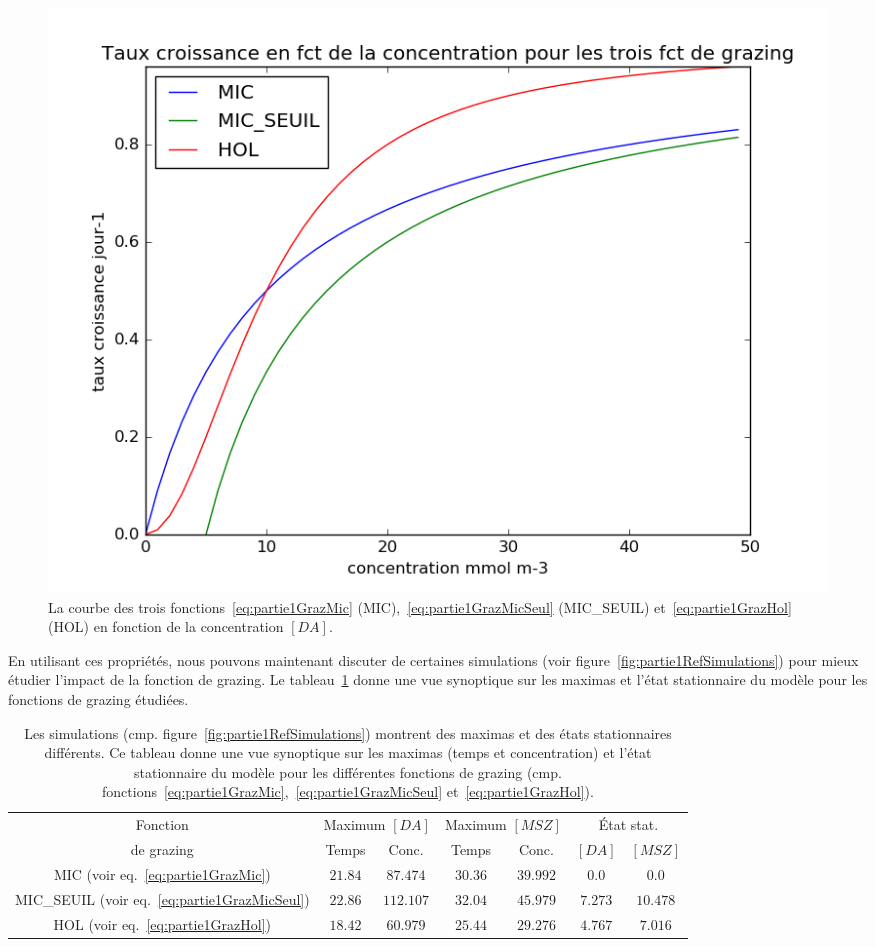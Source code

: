 {\begin{figure}[h!]
  \includegraphics[width=\textwidth]{partie1/grazingFct.png}
  \caption{
La courbe des trois fonctions~\ref{eq:partie1GrazMic} (MIC),~\ref{eq:partie1GrazMicSeul} (MIC\_SEUIL)
et~\ref{eq:partie1GrazHol} (HOL) en fonction de la concentration $[DA]$.
}
  \label{fig:partie1grazingFcts}
\end{figure}

\par{
En utilisant ces propriétés, nous pouvons maintenant discuter de certaines simulations (voir
figure~\ref{fig:partie1RefSimulations}) pour mieux étudier l'impact de la fonction de grazing.
Le tableau~\ref{tab:partie1appPropFctGrazing} donne une vue synoptique sur les maximas et l'état
stationnaire du modèle pour les fonctions de grazing étudiées.
}
\begin{table}[h!]
\begin{center}
\begin{tabular}{ | c | c c | c c | c c |}
\hline
Fonction & \multicolumn{2}{c|}{Maximum $[DA]$} & \multicolumn{2}{c|}{Maximum $[MSZ]$} &
\multicolumn{2}{c|}{État stat.} \\
de grazing & Temps & Conc. & Temps & Conc. & $[DA]$ & $[MSZ]$ \\
\hline
MIC (voir eq.~\ref{eq:partie1GrazMic}) & $21.84$ & $87.474$ & $30.36$ & $39.992$ & $0.0$ & $0.0$ \\
MIC\_SEUIL (voir eq.~\ref{eq:partie1GrazMicSeul}) & $22.86$ & $112.107$ & $32.04$ & $45.979$ & $7.273$ & $10.478$ \\
HOL (voir eq.~\ref{eq:partie1GrazHol}) & $18.42$ & $60.979$ & $25.44$ & $29.276$ & $4.767$ & $7.016$ \\
\hline
\end{tabular}
\end{center}
  \caption{Les simulations (cmp. figure~\ref{fig:partie1RefSimulations}) montrent des maximas et
des états stationnaires différents. Ce tableau donne une vue synoptique sur les maximas
(temps et concentration) et l'état stationnaire du modèle pour les différentes fonctions de grazing
(cmp. fonctions~\ref{eq:partie1GrazMic},~\ref{eq:partie1GrazMicSeul} et~\ref{eq:partie1GrazHol}).}
  \label{tab:partie1appPropFctGrazing}
\end{table}

}
